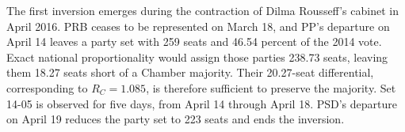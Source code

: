 \documentclass[11pt]{article}
\begin{document}

\begin{table}[htbp]
\centering
\caption{Inverted cabinet party sets and their district components}
\label{tab:cabinet-inversions}
\footnotesize
\setlength{\tabcolsep}{2pt}
\renewcommand{\arraystretch}{1.06}

\end{table}


The first inversion emerges during the contraction of Dilma Rousseff's
cabinet in April 2016. PRB ceases to be represented on March 18, and PP's
departure on April 14 leaves a party set with 259 seats and 46.54 percent
of the 2014 vote. Exact national proportionality would assign those
parties 238.73 seats, leaving them 18.27 seats short of a Chamber majority.
Their 20.27-seat differential, corresponding to \(R_C=1.085\), is
therefore sufficient to preserve the majority. Set 14-05 is observed for five days, from April 14 through April 18. PSD's departure
on April 19 reduces the party set to 223 seats and ends the inversion.

\end{document}
